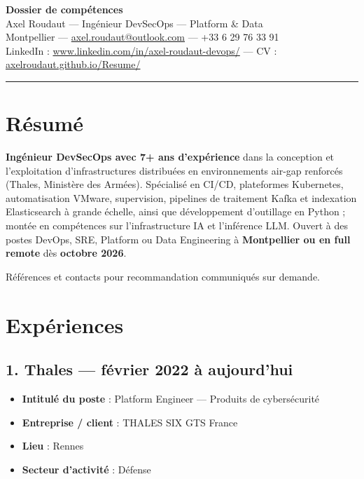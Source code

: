 \documentclass[11pt,a4paper]{article}
\begin{document}
\begin{center}
  {\LARGE\bfseries\color{accent} Dossier de compétences}\\[6pt]
  {\large Axel Roudaut --- Ingénieur DevSecOps --- Platform \& Data}\\[4pt]
  {\small Montpellier --- \href{mailto:axel.roudaut@outlook.com}{axel.roudaut@outlook.com} --- +33 6 29 76 33 91}\\[3pt]
  {\small LinkedIn : \href{https://www.linkedin.com/in/axel-roudaut-devops/}{www.linkedin.com/in/axel-roudaut-devops/}
   --- CV : \href{https://axelroudaut.github.io/Resume/}{axelroudaut.github.io/Resume/}}
\end{center}

\vspace{4pt}
\textcolor{rule}{\rule{\linewidth}{1pt}}

\section{Résumé}

\textbf{Ingénieur DevSecOps avec 7+ ans d'expérience} dans la conception et l'exploitation d'infrastructures distribuées en environnements air-gap renforcés (Thales, Ministère des Armées). Spécialisé en CI/CD, plateformes Kubernetes, automatisation VMware, supervision, pipelines de traitement Kafka et indexation Elasticsearch à grande échelle, ainsi que développement d'outillage en Python ; montée en compétences sur l'infrastructure IA et l'inférence LLM. Ouvert à des postes DevOps, SRE, Platform ou Data Engineering à \textbf{Montpellier ou en full remote} dès \textbf{octobre 2026}.

Références et contacts pour recommandation communiqués sur demande.

\section{Expériences}

\subsection{1. Thales --- février 2022 à aujourd'hui}

\begin{itemize}
  \item \textbf{Intitulé du poste} : Platform Engineer --- Produits de cybersécurité
  \item \textbf{Entreprise / client} : THALES SIX GTS France
  \item \textbf{Lieu} : Rennes
  \item \textbf{Secteur d'activité} : Défense
\end{itemize}
\end{document}
